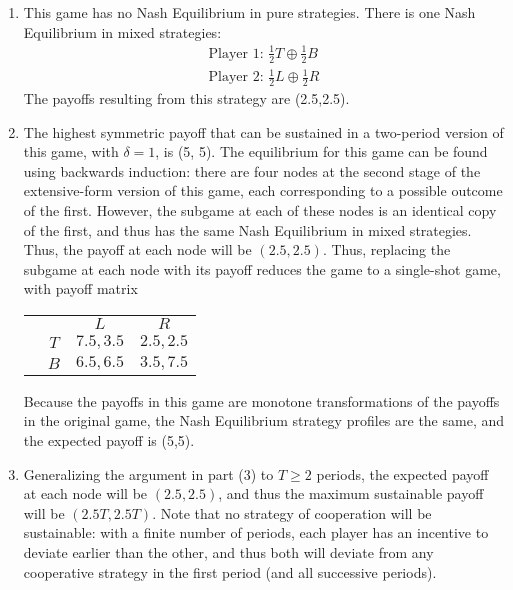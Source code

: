 \documentclass[11pt]{article}
\begin{document}
\begin{enumerate}
\begin{enumerate}
		\item This game has no Nash Equilibrium in pure strategies. There is one Nash Equilibrium in mixed strategies:
		\begin{gather*}
		\text{Player 1: } \frac{1}{2}T \oplus \frac{1}{2}B \\
		\text{Player 2: } \frac{1}{2}L \oplus \frac{1}{2}R
		\end{gather*}
		The payoffs resulting from this strategy are (2.5,2.5). 
		
		\item The highest symmetric payoff that can be sustained in a two-period version of this game, with $ \delta = 1 $, is (5, 5). The equilibrium for this game can be found using backwards induction: there are four nodes at the second stage of the extensive-form version of this game, each corresponding to a possible outcome of the first. However, the subgame at each of these nodes is an identical copy of the first, and thus has the same Nash Equilibrium in mixed strategies. Thus, the payoff at each node will be $ (2.5, 2.5) $. Thus, replacing the subgame at each node with its payoff reduces the game to a single-shot game, with payoff matrix
		
		\begin{table}[!htbp]
			\centering
			\setlength{\extrarowheight}{2pt}
			\begin{tabular}{cc|c|c|}
				& \multicolumn{1}{c}{} & \multicolumn{1}{c}{$L$}  & \multicolumn{1}{c}{$R$} \\\cline{3-4}
				& $T$ & $ 7.5,3.5 $ & $ 2.5,2.5 $ \\\cline{3-4}
				& $B$ & $ 6.5,6.5 $ & $ 3.5,7.5 $ \\\cline{3-4}
			\end{tabular}
		\end{table}
		Because the payoffs in this game are monotone transformations of the payoffs in the original game, the Nash Equilibrium strategy profiles are the same, and the expected payoff is (5,5). 
		
		\item Generalizing the argument in part (3) to $ T\geq 2  $ periods, the expected payoff at each node will be $ (2.5, 2.5) $, and thus the maximum sustainable payoff will be $ (2.5 T, 2.5 T) $. Note that no strategy of cooperation will be sustainable: with a finite number of periods, each player has an incentive to deviate earlier than the other, and thus both will deviate from any cooperative strategy in the first period (and all successive periods). 
		

\end{enumerate}
\end{enumerate}
\end{document}
